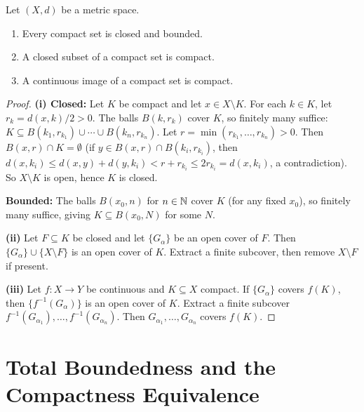 \documentclass[11pt,a4paper]{article}
\begin{document}
\begin{proposition}
\label{prop:compact_basic}
Let $(X,d)$ be a metric space.
\begin{enumerate}[label=(\roman*),nosep]
    \item Every compact set is closed and bounded.
    \item A closed subset of a compact set is compact.
    \item A continuous image of a compact set is compact.
\end{enumerate}
\end{proposition}

\begin{proof}
\textbf{(i) Closed:} Let $K$ be compact and let $x \in X \setminus K$. For
each $k \in K$, let $r_k = d(x,k)/2 > 0$. The balls $B(k, r_k)$ cover $K$,
so finitely many suffice: $K \subseteq B(k_1, r_{k_1}) \cup \cdots \cup
B(k_n, r_{k_n})$. Let $r = \min(r_{k_1}, \ldots, r_{k_n}) > 0$. Then
$B(x, r) \cap K = \emptyset$ (if $y \in B(x,r) \cap B(k_i, r_{k_i})$, then
$d(x, k_i) \le d(x,y) + d(y, k_i) < r + r_{k_i} \le 2r_{k_i} = d(x, k_i)$,
a contradiction). So $X \setminus K$ is open, hence $K$ is closed.

\textbf{Bounded:} The balls $B(x_0, n)$ for $n \in \mathbb{N}$ cover $K$ (for any
fixed $x_0$), so finitely many suffice, giving $K \subseteq B(x_0, N)$ for
some $N$.

\textbf{(ii)} Let $F \subseteq K$ be closed and let $\{G_\alpha\}$ be an
open cover of $F$. Then $\{G_\alpha\} \cup \{X \setminus F\}$ is an open
cover of $K$. Extract a finite subcover, then remove $X \setminus F$ if
present.

\textbf{(iii)} Let $f \colon X \to Y$ be continuous and $K \subseteq X$
compact. If $\{G_\alpha\}$ covers $f(K)$, then $\{f^{-1}(G_\alpha)\}$ is an
open cover of $K$. Extract a finite subcover $f^{-1}(G_{\alpha_1}), \ldots,
f^{-1}(G_{\alpha_n})$. Then $G_{\alpha_1}, \ldots, G_{\alpha_n}$ covers
$f(K)$.
\end{proof}


\section{Total Boundedness and the Compactness Equivalence}
\label{sec:total_bounded}
\end{document}
